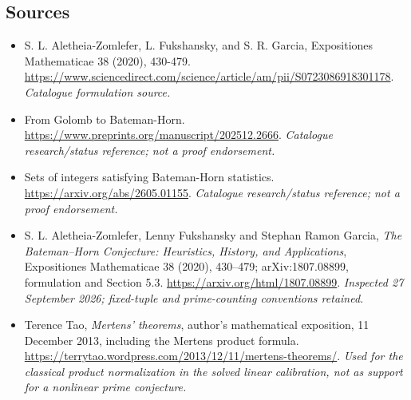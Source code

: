 \documentclass[11pt,a4paper]{article}
\numberwithin{equation}{section}
\begin{document}
\needspace{170mm}
\subsection{Sources}
\begin{itemize}\raggedright
\item[\textnormal{[S1]}]\hypertarget{source:30006717:1}{} S. L. Aletheia-Zomlefer, L. Fukshansky, and S. R. Garcia, Expositiones Mathematicae 38 (2020), 430-479.
\url{https://www.sciencedirect.com/science/article/am/pii/S0723086918301178}.
{\small\textit{Catalogue formulation source.}}
\item[\textnormal{[S2]}]\hypertarget{source:30006717:2}{} From Golomb to Bateman-Horn.
\url{https://www.preprints.org/manuscript/202512.2666}.
{\small\textit{Catalogue research/status reference; not a proof endorsement.}}
\item[\textnormal{[S3]}]\hypertarget{source:30006717:3}{} Sets of integers satisfying Bateman-Horn statistics.
\url{https://arxiv.org/abs/2605.01155}.
{\small\textit{Catalogue research/status reference; not a proof endorsement.}}
\item[\textnormal{[E1]}]\hypertarget{extra:30006717:1}{} S. L. Aletheia-Zomlefer,
Lenny Fukshansky and Stephan Ramon Garcia, \emph{The Bateman--Horn Conjecture:
Heuristics, History, and Applications}, Expositiones Mathematicae 38 (2020),
430--479; arXiv:1807.08899, formulation and Section 5.3.
\url{https://arxiv.org/html/1807.08899}.
{\small\textit{Inspected 27 September 2026; fixed-tuple and prime-counting
conventions retained.}}
\item[\textnormal{[E2]}]\hypertarget{extra:30006717:2}{} Terence Tao,
\emph{Mertens' theorems}, author's mathematical exposition, 11 December 2013,
including the Mertens product formula.
\url{https://terrytao.wordpress.com/2013/12/11/mertens-theorems/}.
{\small\textit{Used for the classical product normalization in the solved
linear calibration, not as support for a nonlinear prime conjecture.}}
\end{itemize}
\end{document}
